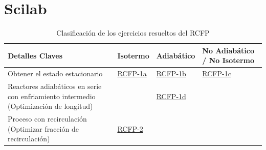 \vspace{0.3cm}
\section{Scilab}
\begin{table}[H]
    \centering
    \renewcommand{\arraystretch}{1.5}
    \begin{tabular}{|m{5cm}|m{3cm}|m{3cm}|m{4cm}|}
        \hline
        \rowcolor{teal!20}
        \textbf{Detalles Claves}                                                              & \textbf{Isotermo}               & \textbf{Adiabático}             & \textbf{No Adiabático / No Isotermo} \\
        \hline
        Obtener el estado estacionario                                                        & \hyperlink{qs:RCFP-1a}{RCFP-1a} & \hyperlink{qs:RCFP-1b}{RCFP-1b} & \hyperlink{qs:RCFP-1c}{RCFP-1c}      \\
        \hline
        Reactores adiabáticos en serie con enfriamiento intermedio (Optimización de longitud) &                                 & \hyperlink{qs:RCFP-1d}{RCFP-1d} &                                      \\
        \hline
        Proceso con recirculación (Optimizar fracción de recirculación)                       & \hyperlink{qs:RCFP-2}{RCFP-2}   &                                 &                                      \\
        \hline
    \end{tabular}
    \caption{Clasificación de los ejercicios resueltos del RCFP}
    \label{tab:clasificacion_rcfp}
\end{table}

